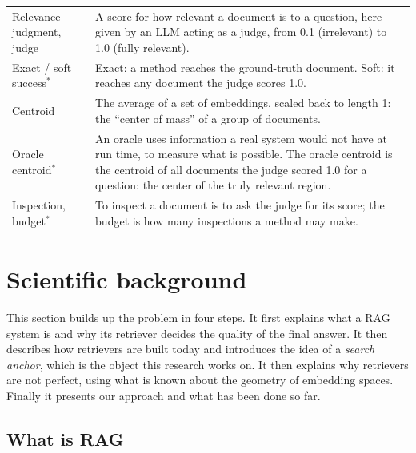 \documentclass[12pt,a4paper]{article}
\begin{document}
\begin{minipage}{\textwidth}
\begin{tabularx}{\textwidth}{>{\raggedright\arraybackslash}p{3.5cm}>{\raggedright\arraybackslash}X}
Relevance judgment, judge & A score for how relevant a document is to a question, here given by an LLM acting as a judge, from 0.1 (irrelevant) to 1.0 (fully relevant). \\
Exact / soft success$^*$ & Exact: a method reaches the ground-truth document. Soft: it reaches any document the judge scores 1.0. \\
Centroid & The average of a set of embeddings, scaled back to length 1: the ``center of mass'' of a group of documents. \\
Oracle centroid$^*$ & An oracle uses information a real system would not have at run time, to measure what is possible. The oracle centroid is the centroid of all documents the judge scored 1.0 for a question: the center of the truly relevant region. \\
Inspection, budget$^*$ & To inspect a document is to ask the judge for its score; the budget is how many inspections a method may make. \\
\bottomrule
\end{tabularx}
\end{minipage}


\section{Scientific background}

This section builds up the problem in four steps. It first explains what a RAG system is and why its retriever decides the quality of the final answer. It then describes how retrievers are built today and introduces the idea of a \emph{search anchor}, which is the object this research works on. It then explains why retrievers are not perfect, using what is known about the geometry of embedding spaces. Finally it presents our approach and what has been done so far.

\subsection{What is RAG}
\end{document}
